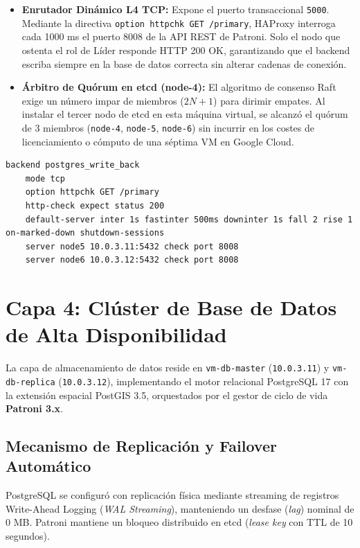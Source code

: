 \documentclass[12pt]{article}
\begin{document}
\begin{itemize}
    \item \textbf{Enrutador Dinámico L4 TCP:} Expone el puerto transaccional \texttt{5000}. Mediante la directiva \texttt{option httpchk GET /primary}, HAProxy interroga cada 1000 ms el puerto 8008 de la API REST de Patroni. Solo el nodo que ostenta el rol de Líder responde HTTP 200 OK, garantizando que el backend escriba siempre en la base de datos correcta sin alterar cadenas de conexión.
    \item \textbf{Árbitro de Quórum en etcd (node-4):} El algoritmo de consenso Raft exige un número impar de miembros ($2N + 1$) para dirimir empates. Al instalar el tercer nodo de etcd en esta máquina virtual, se alcanzó el quórum de 3 miembros (\texttt{node-4}, \texttt{node-5}, \texttt{node-6}) sin incurrir en los costes de licenciamiento o cómputo de una séptima VM en Google Cloud.
\end{itemize}

\begin{lstlisting}[caption={Enrutamiento y detección automática del nodo Líder en HAProxy DB.}]
backend postgres_write_back
    mode tcp
    option httpchk GET /primary
    http-check expect status 200
    default-server inter 1s fastinter 500ms downinter 1s fall 2 rise 1 on-marked-down shutdown-sessions
    server node5 10.0.3.11:5432 check port 8008
    server node6 10.0.3.12:5432 check port 8008
\end{lstlisting}


\section{Capa 4: Clúster de Base de Datos de Alta Disponibilidad}

La capa de almacenamiento de datos reside en \texttt{vm-db-master} (\texttt{10.0.3.11}) y \texttt{vm-db-replica} (\texttt{10.0.3.12}), implementando el motor relacional PostgreSQL 17 con la extensión espacial PostGIS 3.5, orquestados por el gestor de ciclo de vida \textbf{Patroni 3.x}.

\subsection{Mecanismo de Replicación y Failover Automático}
PostgreSQL se configuró con replicación física mediante streaming de registros Write-Ahead Logging (\textit{WAL Streaming}), manteniendo un desfase (\textit{lag}) nominal de 0 MB. Patroni mantiene un bloqueo distribuido en etcd (\textit{lease key} con TTL de 10 segundos). 
\end{document}
